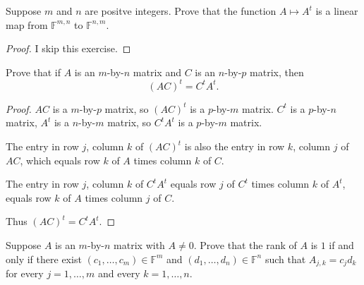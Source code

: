 \begin{exercise}
    Suppose $m$ and $n$ are positve integers. Prove that the function $A\mapsto A^{t}$ is a linear map from $\mathbb{F}^{m,n}$ to $\mathbb{F}^{n,m}$.
\end{exercise}

\begin{proof}
    I skip this exercise.
\end{proof}
\newpage

\begin{exercise}
    Prove that if $A$ is an $m$-by-$n$ matrix and $C$ is an $n$-by-$p$ matrix, then
    \[
        {(AC)}^{t} = C^{t}A^{t}.
    \]
\end{exercise}

\begin{proof}
    $AC$ is a $m$-by-$p$ matrix, so ${(AC)}^{t}$ is a $p$-by-$m$ matrix. $C^{t}$ is a $p$-by-$n$ matrix, $A^{t}$ is a $n$-by-$m$ matrix, so $C^{t}A^{t}$ is a $p$-by-$m$ matrix.

    The entry in row $j$, column $k$ of ${(AC)}^{t}$ is also the entry in row $k$, column $j$ of $AC$, which equals row $k$ of $A$ times column $k$ of $C$.

    The entry in row $j$, column $k$ of $C^{t}A^{t}$ equals row $j$ of $C^{t}$ times column $k$ of $A^{t}$, equals row $k$ of $A$ times column $j$ of $C$.

    Thus ${(AC)}^{t} = C^{t}A^{t}$.
\end{proof}
\newpage

\begin{exercise}
    Suppose $A$ is an $m$-by-$n$ matrix with $A\ne 0$. Prove that the rank of $A$ is $1$ if and only if there exist $(c_{1}, \ldots, c_{m})\in\mathbb{F}^{m}$ and $(d_{1}, \ldots, d_{n})\in\mathbb{F}^{n}$ such that $A_{j,k} = c_{j}d_{k}$ for every $j = 1, \ldots, m$ and every $k = 1, \ldots, n$.
\end{exercise}

